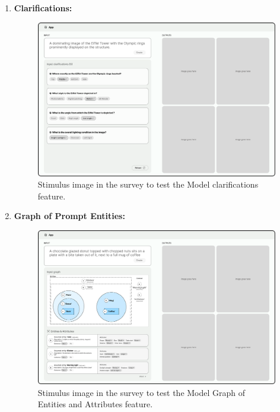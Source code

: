 \begin{enumerate}
\item \textbf{Clarifications:} 
\begin{figure} [H]
    \centering
    \includegraphics[width=.9\linewidth]{figures/F1_Questions.pdf}
    \caption{Stimulus image in the survey to test the Model clarifications feature.}
    \label{fig:interface-human}
\end{figure} 

\clearpage
\item \textbf{Graph of Prompt Entities:}  
\begin{figure} [H]
    \centering
    \includegraphics[width=.9\linewidth]{figures/F2_Graph.pdf}
    \caption{Stimulus image in the survey to test the Model Graph of Entities and Attributes feature.}
    \label{fig:interface-human2}
\end{figure} 


\end{enumerate}
